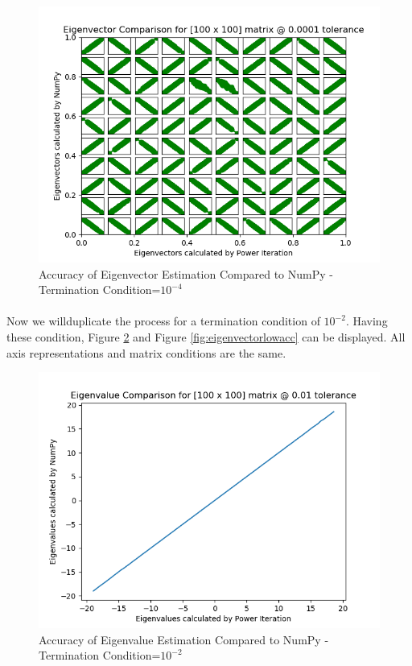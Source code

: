 \documentclass[letterpaper,12pt]{article}
\begin{document}
\begin{figure}[H] 
   \centering \includegraphics[width=\columnwidth]{figures/eigenvector.png}           
                  \caption{Accuracy of Eigenvector Estimation Compared to NumPy - Termination Condition=$10^{-4}$}                
                     \label{fig:eigenvector}
   \end{figure}
   \paragraph{} Now we willduplicate the process for a termination condition of $10^{-2}$. Having these condition, Figure \ref{fig:eigenvaluelowacc} and Figure \ref{fig:eigenvectorlowacc} can be displayed. All axis representations and matrix conditions are the same.
   \begin{figure}[H] 
      \centering \includegraphics[width=0.7\columnwidth]{figures/eigenvaluelowacc.png}           
                     \caption{Accuracy of Eigenvalue Estimation Compared to NumPy - Termination Condition=$10^{-2}$}                
                        \label{fig:eigenvaluelowacc}
      \end{figure}  
\end{document}
